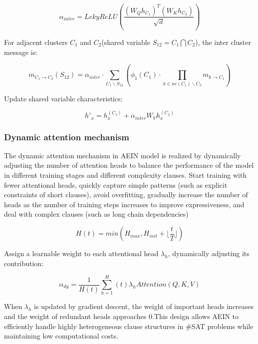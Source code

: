 \begin{equation}
\alpha_{inter}=LekyReLU(\frac{(W_Qh_{C_1})^T(W_Kh_{C_2})}{\sqrt{d}})
\end{equation}

For adjacent clusters \(C_1\) and \(C_2\)(shared variable \(S_{12}=C_1\bigcap C_2\)), the inter cluster message is:

\begin{equation}
    m_{C_1\rightarrow C_2}(S_{12})=\alpha_{inter}\cdot\sum_{C_1\backslash S_{12}}(\phi_1(C_1)\cdot\prod_
    {k\in ne(C_1)\backslash C_2}m_{k\rightarrow C_1})
\end{equation}

Update shared variable characteristics:

\begin{equation}
h'_x=h_x^{(C_1)}+\alpha_{inter}W_Vh_x^{(C_2)}
\end{equation}

\subsubsection{Dynamic attention mechanism}
The dynamic attention mechanism in AEIN model is realized by dynamically adjusting the number of attention heads to 
balance the performance of the model in different training stages and different complexity clauses. Start training 
with fewer attentional heads, quickly capture simple patterns (such as explicit constraints of short clauses), avoid 
overfitting, gradually increase the number of heads as the number of training steps increases to improve expressiveness, 
and deal with complex clauses (such as long chain dependencies) 

\begin{equation}
H(t)=min(H_{max},H_{init}+\lfloor\frac{t}{T}\rfloor)
\end{equation}

Assign a learnable weight to each attentional head \(\lambda_h\), dynamically adjusting its contribution:

\begin{equation}
\alpha_{dy}=\frac{1}{H(t)}\sum_{h=1}^H(t) \lambda_h Attention(Q,K,V)
\end{equation}

When \(\lambda_h\) is updated by gradient descent, the weight of important heads increases and the weight of redundant 
heads approaches 0.This design allows AEIN to efficiently handle highly heterogeneous clause structures in \#SAT problems 
while maintaining low computational costs.

